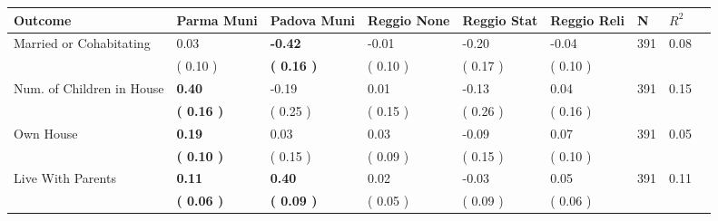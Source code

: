 \begin{tabular}{L{6.2cm} C{1.8cm} C{1.8cm} C{1.8cm} C{1.8cm} C{1.8cm} C{1.8cm} C{0.3cm} C{0.3cm}}
\toprule
 \textbf{Outcome} & \textbf{Parma Muni} & \textbf{Padova Muni} & \textbf{Reggio None} & \textbf{Reggio Stat} & \textbf{Reggio Reli} & \textbf{N} & \textbf{$ R^2$} \\
\midrule
Married or Cohabitating &      0.03 & \textbf{    -0.42} &     -0.01 &     -0.20 &     -0.04  & 391 &       0.08 \\ 
 & (     0.10 ) & \textbf{(     0.16 )} & (     0.10 ) & (     0.17 ) & (     0.10 )  & \\
Num. of Children in House & \textbf{     0.40} &     -0.19 &      0.01 &     -0.13 &      0.04  & 391 &       0.15 \\ 
 & \textbf{(     0.16 )} & (     0.25 ) & (     0.15 ) & (     0.26 ) & (     0.16 )  & \\
Own House & \textbf{     0.19} &      0.03 &      0.03 &     -0.09 &      0.07  & 391 &       0.05 \\ 
 & \textbf{(     0.10 )} & (     0.15 ) & (     0.09 ) & (     0.15 ) & (     0.10 )  & \\
Live With Parents & \textbf{     0.11} & \textbf{     0.40} &      0.02 &     -0.03 &      0.05  & 391 &       0.11 \\ 
 & \textbf{(     0.06 )} & \textbf{(     0.09 )} & (     0.05 ) & (     0.09 ) & (     0.06 )  & \\
\bottomrule
\end{tabular}
